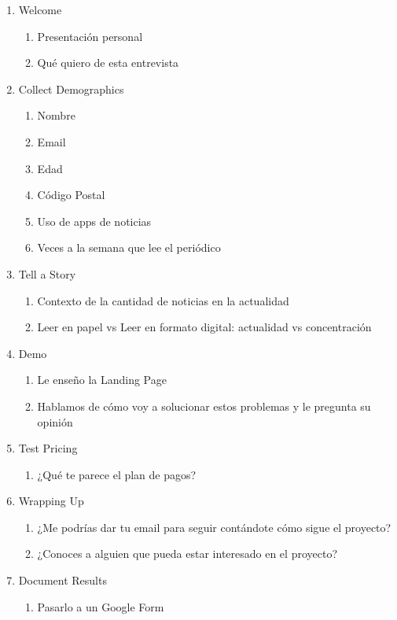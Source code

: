 \begin{enumerate}
    \item Welcome
    \begin{enumerate}
        \item Presentación personal
        \item Qué quiero de esta entrevista
    \end{enumerate}
    \item Collect Demographics
    \begin{enumerate}
        \item Nombre
        \item Email
        \item Edad
        \item Código Postal
        \item Uso de apps de noticias
        \item Veces a la semana que lee el periódico
    \end{enumerate}
    \item Tell a Story
    \begin{enumerate}
        \item Contexto de la cantidad de noticias en la actualidad
        \item Leer en papel vs Leer en formato digital: actualidad vs concentración
    \end{enumerate}
    \item Demo
    \begin{enumerate}
        \item Le enseño la Landing Page
        \item Hablamos de cómo voy a solucionar estos problemas y le pregunta su opinión
    \end{enumerate}
    \item Test Pricing
    \begin{enumerate}
        \item ¿Qué te parece el plan de pagos?
    \end{enumerate}
    \item Wrapping Up
    \begin{enumerate}
        \item ¿Me podrías dar tu email para seguir contándote cómo sigue el proyecto?
        \item ¿Conoces a alguien que pueda estar interesado en el proyecto?
    \end{enumerate}
    \item Document Results
    \begin{enumerate}
        \item Pasarlo a un Google Form
    \end{enumerate}
\end{enumerate}


